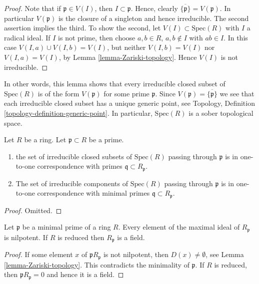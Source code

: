 \begin{proof}
Note that if $ \mathfrak p \in V(I)$, then
$I \subset \mathfrak p$. Hence,
clearly $\overline{\{\mathfrak p\}} = V(\mathfrak p)$.
In particular $V(\mathfrak p)$ is the closure of
a singleton and hence irreducible.
The second assertion implies the third.
To show the second, let
$V(I) \subset \text{Spec}(R)$ with $I$ a radical ideal.
If $I$ is not prime, then choose $a, b\in R$, $a, b\not \in I$
with $ab\in I$. In this case $V(I, a) \cup V(I, b) = V(I)$,
but neither $V(I, b) = V(I)$ nor $V(I, a) = V(I)$, by
Lemma \ref{lemma-Zariski-topology}. Hence $V(I)$ is not
irreducible.
\end{proof}

\noindent
In other words, this lemma shows that every irreducible closed
subset of $\text{Spec}(R)$ is of the form $V(\mathfrak p)$ for
some prime $\mathfrak p$. Since $V(\mathfrak p) = \overline{\{\mathfrak p\}}$
we see that each irreducible closed subset has a unique generic point,
see Topology, Definition \ref{topology-definition-generic-point}.
In particular, $\text{Spec}(R)$ is a sober topological space.

\begin{lemma}
\label{lemma-irreducible-components-containing-x}
Let $R$ be a ring. Let $\mathfrak p \subset R$ be a prime.
\begin{enumerate}
\item the set of irreducible closed subsets of $\text{Spec}(R)$
passing through $\mathfrak p$ is in one-to-one correspondence with
primes $\mathfrak q \subset R_{\mathfrak p}$.
\item The set of irreducible components of $\text{Spec}(R)$ passing through
$\mathfrak p$ is in one-to-one correspondence with minimal
primes $\mathfrak q \subset R_{\mathfrak p}$.
\end{enumerate}
\end{lemma}

\begin{proof}
Omitted.
\end{proof}


\begin{lemma}
\label{lemma-minimal-prime-reduced-ring}
Let $\mathfrak p$ be a minimal prime of a ring $R$.
Every element of the maximal ideal of $R_{\mathfrak p}$
is nilpotent. If $R$ is reduced then $R_{\mathfrak p}$
is a field.
\end{lemma}

\begin{proof}
If some element $x$ of ${\mathfrak p}R_{\mathfrak p}$
is not nilpotent, then $D(x) \not = \emptyset$, see
Lemma \ref{lemma-Zariski-topology}. This contradicts
the minimality of $\mathfrak p$. If $R$ is reduced,
then ${\mathfrak p}R_{\mathfrak p} = 0$ and
hence it is a field.
\end{proof}

